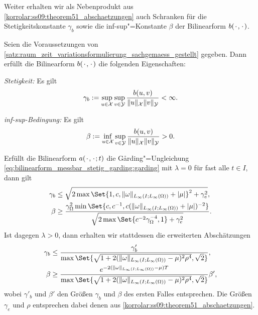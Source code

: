 \documentclass[../main.tex]{subfiles}
\begin{document}
Weiter erhalten wir als Nebenprodukt aus \cref{korrolar:ss09:theorem51_abschaetzungen} auch Schranken für die Stetigkeitskonstante $\gamma_{b}$ sowie die inf-sup"=Konstante $\beta$ der Bilinearform $b({\mkern2mu\cdot\mkern2mu}, {\mkern2mu\cdot\mkern2mu})$.

\begin{Korollar}
\label{korollar:rz_variationsformulierung_stetig_infsup_schranken}
    Seien die Voraussetzungen von \cref{satz:raum_zeit_variationsformulierung_sachgemaess_gestellt} gegeben.
    Dann erfüllt die Bilinearform $b({\mkern2mu\cdot\mkern2mu}, {\mkern2mu\cdot\mkern2mu})$ die folgenden Eigenschaften:
    \begin{thmenumerate}
        \item \emph{Stetigkeit:} Es gilt
            \begin{equation}
                \gamma_{b} := \sup_{u \in \mathcal X} \sup_{v \in \mathcal Y} \frac{b(u, v)}{\lVert u\rVert_{\mathcal X} \lVert v\rVert_{\mathcal Y}} < \infty.
            \end{equation}
        \item \emph{inf-sup-Bedingung:} Es gilt
            \begin{equation}
                \beta := \inf_{u \in \mathcal X} \sup_{v \in \mathcal Y} \frac{b(u, v)}{\lVert u\rVert_{\mathcal X} \lVert v\rVert_{\mathcal Y}} > 0.
            \end{equation}
    \end{thmenumerate}

    Erfüllt die Bilinearform $a({\mkern2mu\cdot\mkern2mu}, {\mkern2mu\cdot\mkern2mu}; t)$ die G\aa{}rding"=Ungleichung \cref{eq:bilinearform_messbar_stetig_garding:garding} mit $\lambda = 0$ für fast alle $t \in I$, dann gilt
    \begin{align}
        \gamma_{b}  &\leq \sqrt{2 \max\Set{ 1, c, \norm{\omega}_{L_{\infty}(I; L_{\infty}(\Omega))} + \abs{\mu} }^{2} + \gamma_{e}^{2} }, \\
        \beta &\geq \frac{\gamma_{\Omega}^{2} \min\Set{c, c^{-1}, c (\norm{\omega}_{L_{\infty}(I; L_{\infty}(\Omega))} + \abs{\mu})^{-2}}}{\sqrt{2 \max\Set{c^{-2}\gamma_{\Omega}^{-4}, 1} + \gamma_{e}^{2}}}.
    \end{align}
    Ist dagegen $\lambda > 0$, dann erhalten wir stattdessen die erweiterten Abschätzungen
    \begin{align}
        \gamma_{b} &\leq \frac{\gamma'_{b}}{\max\Set{\sqrt{1 + 2 (\norm{\omega}_{L_{\infty}(I; L_{\infty}(\Omega))} - \mu)^{2} \rho^{4} }, \sqrt{2}}}, \\
        \beta &\geq \frac{e^{-2(\norm{\omega}_{L_{\infty}(I; L_{\infty}(\Omega))} - \mu) T}}{\max\Set{\sqrt{1 + 2 (\norm{\omega}_{L_{\infty}(I; L_{\infty}(\Omega))} - \mu)^{2} \rho^{4} }, \sqrt{2}}} \beta',
    \end{align}
    wobei $\gamma'_{b}$ und $\beta'$ den Größen $\gamma_{b}$ und $\beta$ des ersten Falles entsprechen.
    Die Größen $\gamma_{e}$ und $\rho$ entsprechen dabei denen aus \cref{korrolar:ss09:theorem51_abschaetzungen}.


\end{Korollar}
\end{document}

